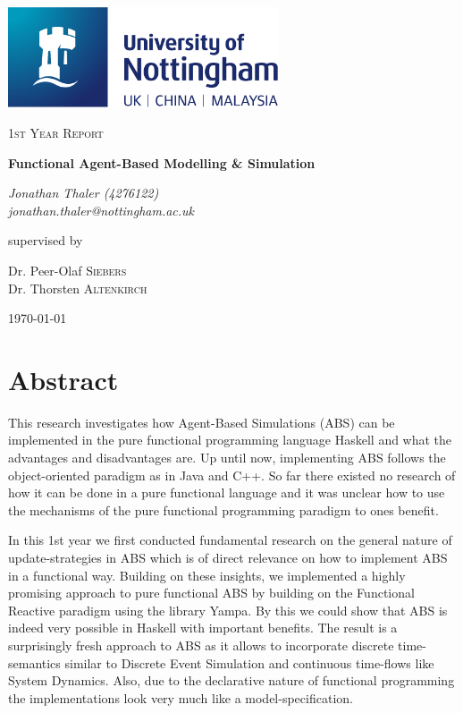\documentclass[oneside]{book}
\begin{document}
\begin{titlepage}
	\centering
	\includegraphics[width=0.60\textwidth]{./logo/UoN_Primary_Logo_RGB.png}\par\vspace{1cm}
	{\scshape\Large 1st Year Report\par}
	\vspace{1.5cm}
	{\huge\bfseries Functional Agent-Based Modelling \& Simulation\par}
	\vspace{2cm}
	{\Large\itshape Jonathan Thaler (4276122) \\ jonathan.thaler@nottingham.ac.uk \par}
	\vfill
	supervised by\par
	Dr. Peer-Olaf \textsc{Siebers} \\
	Dr. Thorsten \textsc{Altenkirch}

	\vfill

	{\large \today\par}
\end{titlepage}

\cleardoublepage

\section*{Abstract}
This research investigates how Agent-Based Simulations (ABS) can be implemented in the pure functional programming language Haskell and what the advantages and disadvantages are. Up until now, implementing ABS follows the object-oriented paradigm as in Java and C++. So far there existed no research of how it can be done in a pure functional language and it was unclear how to use the mechanisms of the pure functional programming paradigm to ones benefit. 

In this 1st year we first conducted fundamental research on the general nature of update-strategies in ABS which is of direct relevance on how to implement ABS in a functional way.
Building on these insights, we implemented a highly promising approach to pure functional ABS by building on the Functional Reactive paradigm using the library Yampa. By this we could show that ABS is indeed very possible in Haskell with important benefits. The result is a surprisingly fresh approach to ABS as it allows to incorporate discrete time-semantics similar to Discrete Event Simulation and continuous time-flows like System Dynamics. Also, due to the declarative nature of functional programming the implementations look very much like a model-specification.
\end{document}
